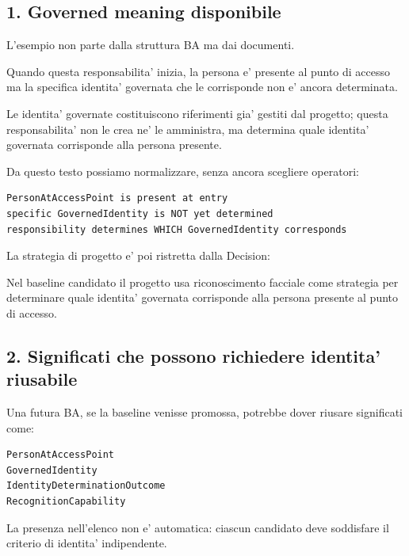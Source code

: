 \documentclass[11pt,a4paper]{article}
\begin{document}
\subsection{1. Governed meaning disponibile}

L'esempio non parte dalla struttura BA ma dai documenti.

\begin{sourcebox}[MR-0003 CANDIDATE R2]
Quando questa responsabilita' inizia, la persona e' presente al punto di accesso ma la specifica identita' governata che le corrisponde non e' ancora determinata.

Le identita' governate costituiscono riferimenti gia' gestiti dal progetto; questa responsabilita' non le crea ne' le amministra, ma determina quale identita' governata corrisponde alla persona presente.
\end{sourcebox}

Da questo testo possiamo normalizzare, senza ancora scegliere operatori:

\begin{lstlisting}
PersonAtAccessPoint is present at entry
specific GovernedIdentity is NOT yet determined
responsibility determines WHICH GovernedIdentity corresponds
\end{lstlisting}

La strategia di progetto e' poi ristretta dalla Decision:

\begin{sourcebox}[D-3.1 CANDIDATE R2]
Nel baseline candidato il progetto usa riconoscimento facciale come strategia per determinare quale identita' governata corrisponde alla persona presente al punto di accesso.
\end{sourcebox}

\subsection{2. Significati che possono richiedere identita' riusabile}

Una futura BA, se la baseline venisse promossa, potrebbe dover riusare significati come:

\begin{lstlisting}
PersonAtAccessPoint
GovernedIdentity
IdentityDeterminationOutcome
RecognitionCapability
\end{lstlisting}

La presenza nell'elenco non e' automatica: ciascun candidato deve soddisfare il criterio di identita' indipendente.
\end{document}
